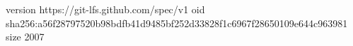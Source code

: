 version https://git-lfs.github.com/spec/v1
oid sha256:a56f28797520b98bdfb41d9485bf252d33828f1c6967f28650109e644c963981
size 2007
